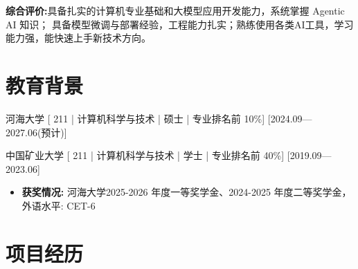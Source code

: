 \documentclass{resume-photo}
\begin{document}

\ResumeTitle


\noindent \textbf{综合评价:}具备扎实的计算机专业基础和大模型应用开发能力，系统掌握 Agentic AI 知识；
具备模型微调与部署经验，工程能力扎实；熟练使用各类AI工具，学习能力强，能快速上手新技术方向。

\section{教育背景}
\ResumeItem
{河海大学}
[\textnormal{ 211 | 计算机科学与技术 | 硕士 | 专业排名前 10\%}]
[2024.09—2027.06(预计)]

\vspace{0.3em}

\ResumeItem
{中国矿业大学}
[\textnormal{ 211 | 计算机科学与技术 | 学士 | 专业排名前 40\%}]
[2019.09—2023.06]
\begin{itemize}
  \item \textbf{获奖情况:} 河海大学2025-2026 年度一等奖学金、2024-2025 年度二等奖学金，外语水平: CET-6
\end{itemize}

\section{项目经历}
\end{document}
